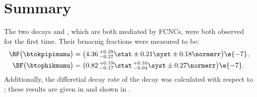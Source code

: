 \section{Summary}
\label{sec:hhh:conc}

The two decays \btokpipimumu and \btophikmumu, which are both mediated by FCNCs, were both observed
for the first time.
Their brnacnig fractions were measured to be:
\begin{align*}
  \BF\big( \btokpipimumu \big)&=
  \big(4.36\,^{+0.29}_{-0.27}\stat\pm0.21\syst\pm0.18\normerr\big)\e{-7}, \\
  \BF\big(\btophikmumu\big)&=
  \big(0.82\,^{+0.19}_{-0.17}\stat\,^{+0.10}_{-0.04}\syst\pm0.27\normerr\big)\e{-7}.
\end{align*}
Additionally, the differetial decay rate of the decay \btokpipimumu was calculated with respect to
\qsq; these results are given in  and shown in .





